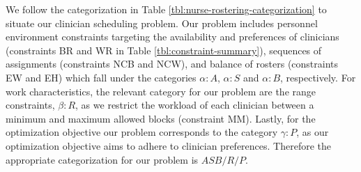 



We follow the categorization in Table \ref{tbl:nurse-rostering-categorization} to situate our clinician
scheduling problem. Our problem includes 
personnel environment constraints targeting the availability and preferences of clinicians
(constraints BR and WR in Table \ref{tbl:constraint-summary}),
sequences of assignments (constraints NCB and NCW), and balance of rosters (constraints EW and EH) 
which fall under the categories $\alpha : A$, $\alpha : S$ and $\alpha : B$,  %
respectively. 
For work characteristics, the relevant category for our problem are the range
constraints, $\beta : R$, 
as we restrict the workload of each clinician between a minimum and maximum
allowed blocks (constraint MM).
Lastly, for the optimization objective our problem corresponds to the category
$\gamma : P$, as our optimization objective
aims to adhere to clinician preferences. Therefore the appropriate categorization
for our problem is $ASB/R/P$.

